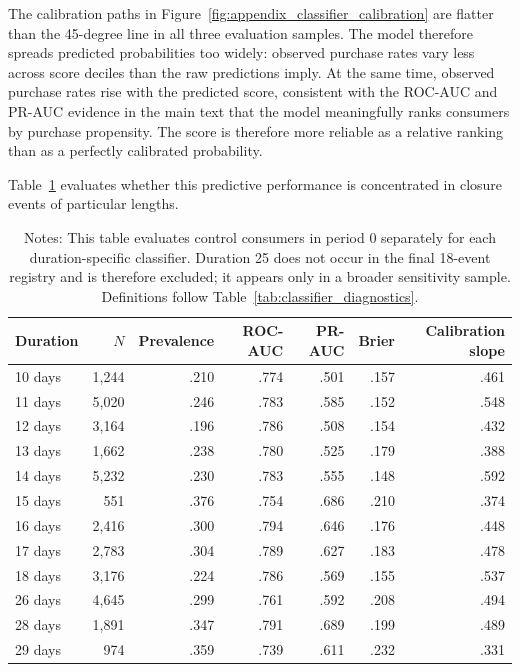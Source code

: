 \documentclass[11 pt]{article}
\newcommand\fnote[1]{\captionsetup{font=footnotesize}\caption*{#1}}
\begin{document}
The calibration paths in Figure~\ref{fig:appendix_classifier_calibration} are flatter than the 45-degree line in all three evaluation samples. The model therefore spreads predicted probabilities too widely: observed purchase rates vary less across score deciles than the raw predictions imply. At the same time, observed purchase rates rise with the predicted score, consistent with the ROC-AUC and PR-AUC evidence in the main text that the model meaningfully ranks consumers by purchase propensity. The score is therefore more reliable as a relative ranking than as a perfectly calibrated probability.

Table~\ref{tab:appendix_classifier_duration} evaluates whether this predictive performance is concentrated in closure events of particular lengths.

\begin{table}[!ht]
\centering
\caption{Period-0 control performance by closure duration}
\label{tab:appendix_classifier_duration}
\small
\begin{tabularx}{0.94\textwidth}{Xrrrrrr}
\toprule
Duration & $N$ & Prevalence & ROC-AUC & PR-AUC & Brier & Calibration slope \\
\midrule
10 days & 1,244 & .210 & .774 & .501 & .157 & .461 \\
11 days & 5,020 & .246 & .783 & .585 & .152 & .548 \\
12 days & 3,164 & .196 & .786 & .508 & .154 & .432 \\
13 days & 1,662 & .238 & .780 & .525 & .179 & .388 \\
14 days & 5,232 & .230 & .783 & .555 & .148 & .592 \\
15 days & 551 & .376 & .754 & .686 & .210 & .374 \\
16 days & 2,416 & .300 & .794 & .646 & .176 & .448 \\
17 days & 2,783 & .304 & .789 & .627 & .183 & .478 \\
18 days & 3,176 & .224 & .786 & .569 & .155 & .537 \\
26 days & 4,645 & .299 & .761 & .592 & .208 & .494 \\
28 days & 1,891 & .347 & .791 & .689 & .199 & .489 \\
29 days & 974 & .359 & .739 & .611 & .232 & .331 \\
\bottomrule
\end{tabularx}
\vspace{1mm}
\fnote{Notes: This table evaluates control consumers in period 0 separately for each duration-specific classifier. Duration 25 does not occur in the final 18-event registry and is therefore excluded; it appears only in a broader sensitivity sample. Definitions follow Table~\ref{tab:classifier_diagnostics}.}
\end{table}
\end{document}
